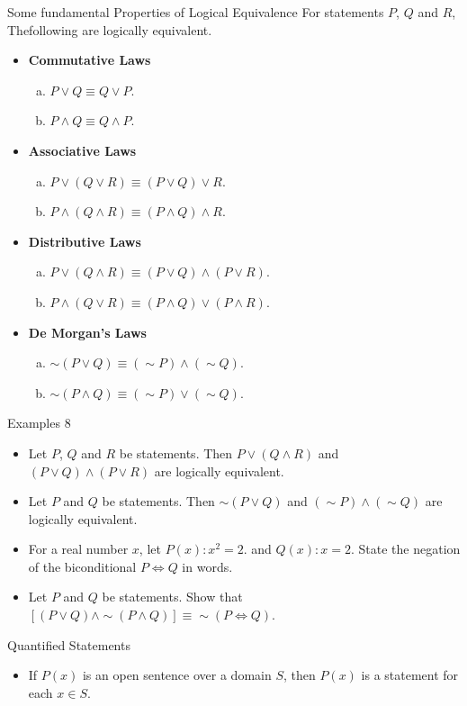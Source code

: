 \documentclass{beamer}
\begin{document}
\begin{frame}{Some fundamental Properties of Logical Equivalence}
For statements $P$, $Q$ and $R$, Thefollowing are logically equivalent.
\begin{itemize}
    \item \textbf{Commutative Laws}
    \begin{enumerate}[(a)]
        \item $P \lor Q \equiv Q \lor P$.
        \item $P \land Q \equiv Q \land P$.
    \end{enumerate}
    \item \textbf{Associative Laws}
    \begin{enumerate}[(a)]
        \item $P \lor (Q \lor R) \equiv (P \lor Q) \lor R$.
        \item $P \land (Q \land R) \equiv (P \land Q) \land R$.
    \end{enumerate}
    \item \textbf{Distributive Laws}
    \begin{enumerate}[(a)]
        \item $P \lor (Q \land R) \equiv (P \lor Q) \land (P \lor R)$.
        \item $P \land (Q \lor R) \equiv (P \land Q) \lor (P \land R)$.
    \end{enumerate}
    \item \textbf{De Morgan’s Laws}
    \begin{enumerate}[(a)]
        \item $\sim (P \lor Q) \equiv (\sim P) \land (\sim Q)$.
        \item $\sim (P \land Q) \equiv (\sim P) \lor (\sim Q)$.
    \end{enumerate}
\end{itemize}
\end{frame}

\begin{frame}{Examples 8}
\begin{itemize}
    \item Let $P$, $Q$ and $R$ be statements. Then $P \lor (Q \land R)$ and $(P \lor Q) \land (P \lor R)$ are logically equivalent.
    \item Let $P$ and $Q$ be statements. Then $\sim (P \lor Q)$ and $(\sim P) \land (\sim Q)$ are logically equivalent.
    \item For a real number $x$, let $P(x): x^2 = 2$. and $Q(x): x = 2$. State the negation of the biconditional $P \Leftrightarrow Q$ in words.
    \item Let $P$ and $Q$ be statements. Show that $[(P \lor Q) \land \sim (P \land Q)] \equiv \sim (P \Leftrightarrow Q)$.
\end{itemize}
\end{frame}

\begin{frame}{Quantified Statements}
\begin{itemize}
    \item If $P(x)$ is an open sentence over a domain $S$, then $P(x)$ is a statement for each $x \in S$.
\end{itemize}
\end{frame}
\end{document}
